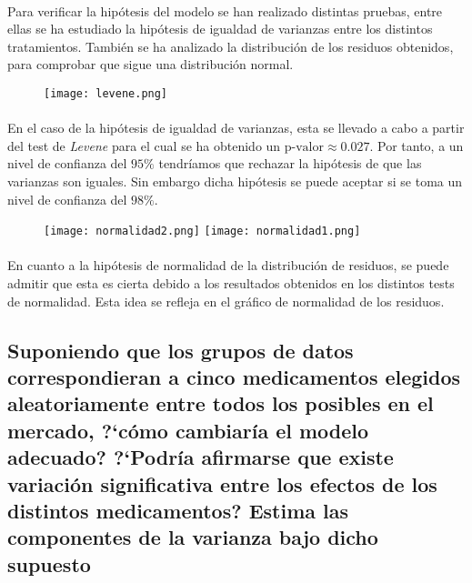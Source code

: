 \documentclass{article}
\begin{document}
      \paragraph{}
      Para verificar la hipótesis del modelo se han realizado distintas pruebas, entre ellas se ha estudiado la hipótesis de igualdad de varianzas entre los distintos tratamientos. También se ha analizado la distribución de los residuos obtenidos, para comprobar que sigue una distribución normal.

      \begin{figure}[H]
        \centering
        \texttt{[image: levene.png]}
      \end{figure}

      \paragraph{}
      En el caso de la hipótesis de igualdad de varianzas, esta se llevado a cabo a partir del test de \emph{Levene} para el cual se ha obtenido un $\text{p-valor} \approx 0.027$. Por tanto, a un nivel de confianza del $95\%$ tendríamos que rechazar la hipótesis de que las varianzas son iguales. Sin embargo dicha hipótesis se puede aceptar si se toma un nivel de confianza del $98\%$.

      \begin{figure}[H]
        \centering
        \texttt{[image: normalidad2.png]}
        \texttt{[image: normalidad1.png]}
      \end{figure}

      \paragraph{}
      En cuanto a la hipótesis de normalidad de la distribución de residuos, se puede admitir que esta es cierta debido a los resultados obtenidos en los distintos tests de normalidad. Esta idea se refleja en el gráfico de normalidad de los residuos.


    \subsection{Suponiendo que los grupos de datos correspondieran a cinco medicamentos elegidos aleatoriamente entre todos los posibles en el mercado, ?`cómo cambiaría el modelo adecuado? ?`Podría afirmarse que existe variación significativa entre los efectos de los distintos medicamentos? Estima las componentes de la varianza bajo dicho supuesto}
\end{document}
